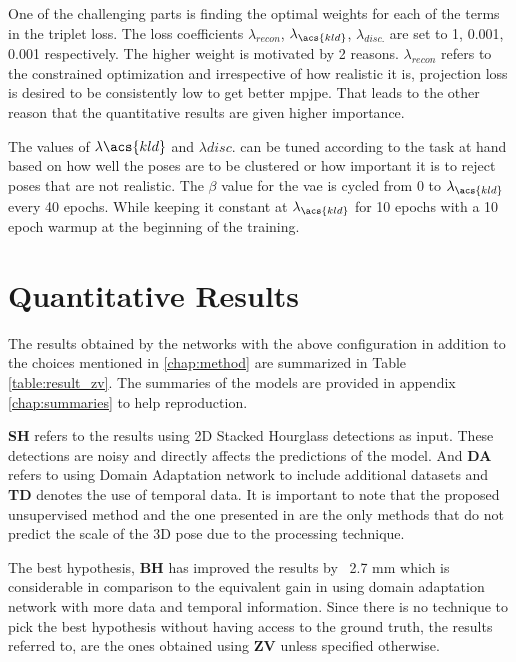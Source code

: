 One of the challenging parts is finding the optimal weights for each of the terms in the triplet loss. The loss coefficients $\lambda_{recon}$, $\lambda_{\acs{kld}}$, $\lambda_{disc.}$ are set to 1, 0.001, 0.001 respectively. The higher weight is motivated by 2 reasons. $\lambda_{recon}$ refers to the constrained optimization and irrespective of how realistic it is, projection loss is desired to be consistently low to get better \ac{mpjpe}. That leads to the other reason that the quantitative results are given higher importance.

The values of $\lambda{\acs{kld}}$ and $\lambda{disc.}$ can be tuned according to the task at hand based on how well the poses are to be clustered or how important it is to reject poses that are not realistic. The $\beta$ value for the \ac{vae} is cycled from 0 to $\lambda_{\acs{kld}}$ every 40 epochs. While keeping it constant at $\lambda_{\acs{kld}}$ for 10 epochs with a 10 epoch warmup at the beginning of the training.

\section{Quantitative Results}

The results obtained by the networks with the above configuration in addition to the choices mentioned in \ref{chap:method} are summarized in Table \ref{table:result_zv}. The summaries of the models are provided in appendix \ref{chap:summaries} to help reproduction.



\textbf{SH} refers to the results using 2D Stacked Hourglass detections as input. These detections are noisy and directly affects the predictions of the model. And \textbf{DA} refers to using Domain Adaptation network to include additional datasets and \textbf{TD} denotes the use of temporal data. It is important to note that the proposed unsupervised method and the one presented in \cite{amazon1} are the only methods that do not predict the scale of the 3D pose due to the processing technique.



The best hypothesis, \textbf{BH} has improved the results by ~2.7 mm which is considerable in comparison to the equivalent gain in \cite{amazon1} using domain adaptation network with more data and temporal information. Since there is no technique to pick the best hypothesis without having access to the ground truth, the results referred to, are the ones obtained using \textbf{ZV} unless specified otherwise. 

